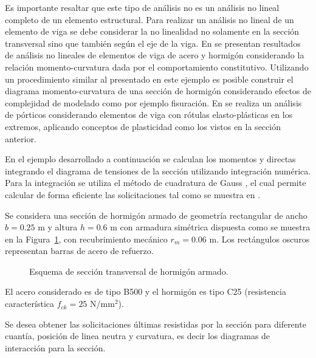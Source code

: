 Es importante resaltar que este tipo de análisis no es un análisis no lineal completo de un elemento estructural. %
%
Para realizar un análisis no lineal de un elemento de viga se debe considerar la no linealidad no solamente en la sección transversal sino que también según el eje de la viga. %
%
En \citep{Liew2017,Lemes2017} se presentan resultados de análisis no lineales de elementos de viga de acero y hormigón considerando la relación momento-curvatura dada por el comportamiento constitutivo. %
%
Utilizando un procedimiento similar al presentado en este ejemplo es posible construir el diagrama momento-curvatura de una sección de hormigón considerando efectos de complejidad de modelado como por ejemplo fisuración. %
%
En \citep{Alhasawi2017} se realiza un análisis de pórticos considerando elementos de viga con rótulas elasto-plásticas en los extremos, aplicando conceptos de plasticidad como los vistos en la sección anterior.


En el ejemplo desarrollado a continuación se calculan los momentos y directas integrando el diagrama de tensiones de la sección utilizando integración numérica. %
%
Para la integración se utiliza el método de cuadratura de Gauss \citep{quarteroni2007numeric}, el cual permite calcular de forma eficiente las solicitaciones tal como se muestra en \citep{Bonet2006}.

Se considera una sección de hormigón armado de geometría rectangular de ancho $b=0.25$ m y altura $h= 0.6$ m con armadura simétrica dispuesta como se muestra en la Figura~\ref{fig:seccion}, con recubrimiento mecánico $r_m=0.06$ m. %
%
Los rectángulos oscuros representan barras de acero de refuerzo.
	
%
\begin{figure}[htb]
	\def\svgwidth{0.4\textwidth}

	\caption{Esquema de sección transversal de hormigón armado.}
	\label{fig:seccion}
\end{figure}

El acero considerado es de tipo B500 y el hormigón es tipo C25 (resistencia característica $f_{ck}=25 $ N/mm$^2$). %

Se desea obtener las solicitaciones últimas resistidas por la sección para diferente cuantía, posición de linea neutra y curvatura, es decir los diagramas de interacción para la sección.

